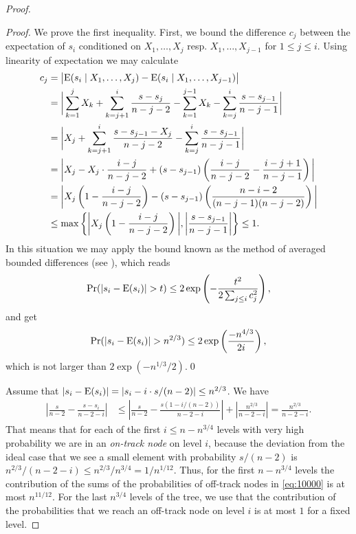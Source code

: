 \documentclass[prodmode,acmtalg]{acmsmall}
\newcommand{\E}{\textnormal{\textrm{E}}}
\begin{document}
\begin{proof}
\begin{proof}
    We prove the first inequality. 
    First, we bound the difference $c_j$ between the expectation of
    $s_i$ conditioned on $X_1,\ldots,X_j$ resp. $X_1,\ldots,X_{j-1}$ for $1 \leq
    j \leq i$.
    Using linearity of expectation we may calculate 
    \begin{align*}
	c_j &= \bigl|\E(s_i \mid X_1,\ldots,X_j) - \E(s_i \mid X_1, \ldots,X_{j-1})\bigr| \\
	    &= \bigg|\sum_{k = 1}^j X_k + \sum_{k = j+1}^{i} \frac{s - s_{j}}{n - j - 2} - \sum_{k = 1}^{j-1} X_k - \sum_{k = j}^{i}
	\frac{s - s_{j-1}}{n - j  - 1}\bigg|\\
	    &= \bigg|X_j + \sum_{k = j+1}^{i} \frac{s - s_{j - 1} - X_j}{n - j - 2}  - \sum_{k = j}^{i}
	\frac{s - s_{j-1}}{n - j  - 1}\bigg|\\
	&= \bigg| X_j - X_j \cdot \frac{i - j}{n-j - 2} + (s - s_{j - 1})
	\left(\frac{i-j}{n - j -2} - \frac{i - j + 1}{n - j - 1}\right) \bigg|\\
	&= \bigg| X_j \left(1 - \frac{i - j}{n-j - 2}\right) - (s - s_{j - 1})
	\left(\frac{n - i - 2}{(n - j - 1)(n-j-2)}\right) \bigg|\\
	&\leq \max\left\{\bigg| X_j \left(1 - \frac{i - j}{n-j - 2}\right)\bigg |, \bigg| \frac{s - s_{j
- 1}}
{n - j - 1} \bigg|\right\} \leq 1.
    \end{align*}
In this situation we may apply the bound known as the method of averaged bounded differences (see
    \cite[Theorem 5.3]{dp09}), which reads
    \begin{align*}
	\Pr(|s_i - \E(s_i)| > t) \leq 2\exp\left(-\frac{t^2}{2\sum_{j \leq
	i}c_j^2}\right),
    \end{align*}
    and get 
    \begin{align*}
        \Pr(|s_i - \E(s_i)| > n^{2/3}) \leq 2\exp\left(\frac{-n^{4/3}}{2i}\right),
    \end{align*}
    which is not larger than $2\exp(-n^{1/3}/2)$.\qed
\end{proof}

Assume that $|s_i - \E(s_i)| = |s_i - i \cdot s/(n-2)| \leq n^{2/3}$. We
have
\begin{align*}
    \left|\frac{s}{n-2} - \frac{s - s_i}{n - 2 - i}\right| &\leq
\left|\frac{s}{n-2} - \frac{s(1 - i/(n-2))}{n-2-i}\right| + \left|\frac{n^{2/3}}{n - 2 -
i}\right|
= \frac{n^{2/3}}{n - 2 - i}.
\end{align*}
That means that for each of the first $i \leq n - n^{3/4}$ levels with very high
probability we are in an \emph{on-track node} on level $i$, because the deviation from the ideal case
that we see a small element with probability $s/(n-2)$ is $n^{2/3} / (n - 2 - i) \leq n^{2/3}/n^{3/4} = 1/n^{1/12}$. 
Thus, for the first $n - n^{3/4}$
levels the contribution of the sums
of the probabilities of off-track nodes in \eqref{eq:10000} is at most $n^{11/12}$. For the last
$n^{3/4}$ levels of the tree, we use that the contribution of the  probabilities
that we reach an off-track node on level $i$ is at most $1$ for a fixed level. 


\end{proof}
\end{document}
